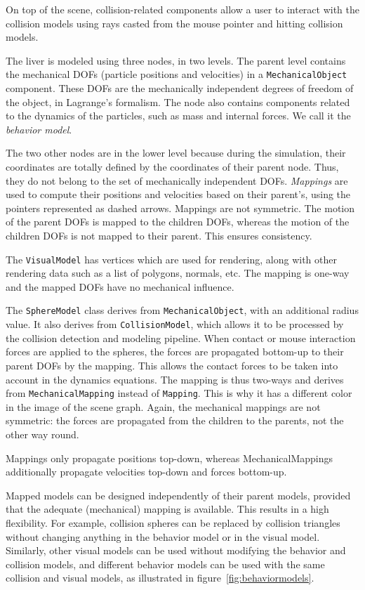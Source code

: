 On top of the scene, collision-related components allow a user to interact with the collision models using rays casted from the mouse pointer and hitting collision models. 

The liver is modeled using three nodes, in two levels. 
The parent level contains the mechanical DOFs (particle positions and velocities) in a \texttt{MechanicalObject} component. 
These DOFs are the mechanically independent degrees of freedom of the object, in Lagrange's formalism. 
The node also contains components related to the dynamics of the particles, such as mass and internal forces. 
We call it the \textit{behavior model}.

The two other nodes are in the lower level because during the simulation, their coordinates are totally defined by the coordinates of their parent node. 
Thus, they do not belong to the set of mechanically independent DOFs. 
\emph{Mappings} are used to compute their positions and velocities based on their parent's, using the pointers represented as dashed arrows. 
Mappings are not symmetric. 
The motion of the parent DOFs is mapped to the children DOFs, whereas the motion of the children DOFs is not mapped to their parent. 
This ensures consistency.

The \texttt{VisualModel} has vertices which are used for rendering, along with other rendering data such as a list of polygons, normals, etc. 
The mapping is one-way and the mapped DOFs have no mechanical influence.

The \texttt{SphereModel} class derives from \texttt{MechanicalObject}, with an additional radius value. 
It also derives from \texttt{CollisionModel}, which allows it to be processed by the collision detection and modeling pipeline. 
When contact or mouse interaction forces are applied to the spheres, the forces are propagated bottom-up to their parent DOFs by the mapping. 
This allows the contact forces to be taken into account in the dynamics equations. 
The mapping is thus two-ways and derives from \texttt{MechanicalMapping} instead of \texttt{Mapping}. 
This is why it has a different color in the image of the scene graph.
Again, the mechanical mappings are not symmetric: the forces are propagated from the children to the parents, not the other way round.

Mappings only propagate positions top-down, whereas MechanicalMappings additionally propagate velocities top-down and forces bottom-up.

Mapped models can be designed independently of their parent models, provided that the adequate (mechanical) mapping is available. 
This results in a high flexibility. 
For example, collision spheres can be replaced by collision triangles without changing anything in the behavior model or in the visual model. 
Similarly, other visual models can be used without modifying the behavior and collision models, and different behavior models can be used with the same collision and visual models, as illustrated in figure~\ref{fig:behaviormodels}.


